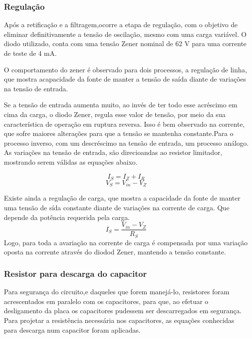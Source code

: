 \documentclass[a4paper,12pt,oneside,openany,table,xcdraw]{article}
\begin{document}
\subsubsection{Regulação}
Após a retificação e a filtragem,ocorre a etapa de regulação, com o objetivo de eliminar definitivamente a tensão de oscilação, mesmo com uma carga variável. O diodo utilizado, conta com uma tensão Zener nominal de 62 V para uma corrente de teste de 4 mA.

O comportamento do zener é observado para dois processos, a regulação de linha, que mostra acapacidade da fonte de manter a tensão de saída diante de variações na tensão de entrada.

Se a tensão de entrada aumenta muito, ao invés de ter todo esse acréscimo em cima da carga, o diodo Zener, regula esse valor de tensão, por meio da sua característica de operação em ruptura reversa. Isso é bem observado na corrente, que sofre maiores alterações para que a tensão se mantenha constante.Para o processo inverso, com um descréscimo na tensão de entrada, um processo análogo. As variações na tensão de entrada, são direcioandas ao resistor limitador, mostrando serem válidas as equações abaixo.

\begin{equation}
I_{S}  = I_{Z} +I_{R}  
\end{equation}
\begin{equation}
V_{S}  = V_{in} - V_{Z}
\end{equation}

Existe ainda a  regulação de carga, que mostra a capacidade da fonte de manter uma tensão de sída constante diante de variações na corrente de carga. Que depende da potência requerida pela carga.
\begin{equation}
I_{S}  =\frac{ V_{in} - V_{Z}  }{R_{S}}
\end{equation}
Logo, para toda a avariação na corrente de carga é compensada por uma variação oposta na corrente através do diodod Zener, mantendo a tensão constante.


\subsubsection{Resistor para descarga do capacitor} \label{descarga}
Para segurança do circuito,e daqueles que forem manejá-lo, resistores foram acrescentados em paralelo com os capacitores, para que, ao efetuar o desligamento da placa os capacitores pudessem ser descarregados em segurança.
Para projetar a resistência necessária nos capacitores, as equações conhecidas para descarga num capacitor foram aplicadas.
\end{document}
